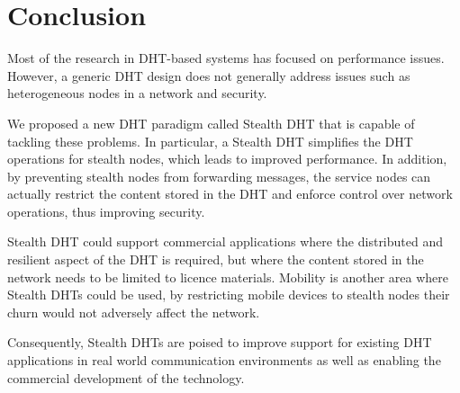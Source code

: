 \documentclass{sig-alt-release}
\begin{document}
\section{Conclusion}
\label{sect:conclusion}

Most of the research in DHT-based systems has focused on performance
issues. However, a generic DHT design does not generally address
issues such as heterogeneous nodes in a network and security.

We proposed a new DHT paradigm called Stealth DHT that is capable of
tackling these problems. In particular, a Stealth DHT simplifies the
DHT operations for stealth nodes, which leads to improved
performance. In addition, by preventing stealth nodes from
forwarding messages, the service nodes can actually restrict the
content stored in the DHT and enforce control over network
operations, thus improving security.

Stealth DHT could support commercial applications where the
distributed and resilient aspect of the DHT is required, but where
the content stored in the network needs to be limited to licence
materials. Mobility is another area where Stealth DHTs could be
used, by restricting mobile devices to stealth nodes their churn
would not adversely affect the network.

Consequently, Stealth DHTs are poised to improve support for
existing DHT applications in real world communication environments
as well as enabling the commercial development of the technology.
\end{document}
